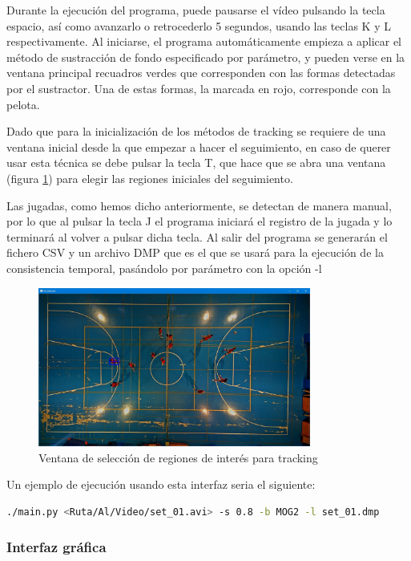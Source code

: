 Durante la ejecución del programa, puede pausarse el vídeo pulsando la tecla espacio, así como avanzarlo o retrocederlo 5 segundos, usando las teclas K y L respectivamente. Al iniciarse, el programa automáticamente empieza a aplicar el método de sustracción de fondo especificado por parámetro, y pueden verse en la ventana principal recuadros verdes que corresponden con las formas detectadas por el sustractor. Una de estas formas, la marcada en rojo, corresponde con la pelota.

Dado que para la inicialización de los métodos de tracking se requiere de una ventana inicial desde la que empezar a hacer el seguimiento, en caso de querer usar esta técnica se debe pulsar la tecla T, que hace que se abra una ventana (figura \ref{fig:iniciatracking}) para elegir las regiones iniciales del seguimiento.

Las jugadas, como hemos dicho anteriormente, se detectan de manera manual, por lo que al pulsar la tecla J el programa iniciará el registro de la jugada y lo terminará al volver a pulsar dicha tecla. Al salir del programa se generarán el fichero CSV y un archivo DMP que es el que se usará para la ejecución de la consistencia temporal, pasándolo por parámetro con la opción -l

\begin{figure}
    \centering
    \includegraphics[width=0.8\textwidth]{images/ejemplotracking}
    \caption{Ventana de selección de regiones de interés para tracking}
    \label{fig:iniciatracking}
\end{figure}

Un ejemplo de ejecución usando esta interfaz seria el siguiente:
\begin{lstlisting}[language=bash]
  ./main.py <Ruta/Al/Video/set_01.avi> -s 0.8 -b MOG2 -l set_01.dmp
\end{lstlisting}


\subsubsection*{Interfaz gráfica}


